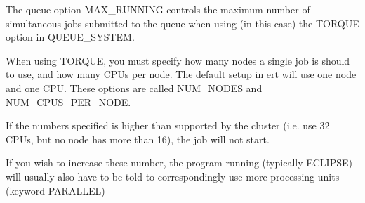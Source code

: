 \documentclass[letterpaper,10pt,english]{sphinxmanual}
\begin{document}

The queue option MAX\_RUNNING controls the maximum number of simultaneous jobs
submitted to the queue when using (in this case) the TORQUE option in
QUEUE\_SYSTEM.

%
\begin{sphinxVerbatim}[commandchars=\\\{\}]
 
       
    
   
\end{sphinxVerbatim}


When using TORQUE, you must specify how many nodes a single job is should to
use, and how many CPUs per node. The default setup in ert will use one node and
one CPU. These options are called NUM\_NODES and NUM\_CPUS\_PER\_NODE.

If the numbers specified is higher than supported by the cluster (i.e. use 32
CPUs, but no node has more than 16), the job will not start.

If you wish to increase these number, the program running (typically ECLIPSE)
will usually also have to be told to correspondingly use more processing units
(keyword PARALLEL)

%
\begin{sphinxVerbatim}[commandchars=\\\{\}]
 
     
       
        
       
   
   
\end{sphinxVerbatim}
\end{document}
